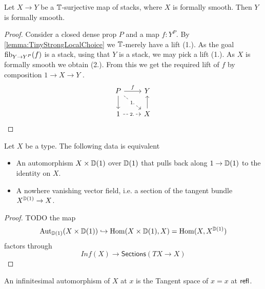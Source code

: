 \begin{lemma}
	Let $X \to Y$ be a $\mathbb{T}$-surjective map of stacks, where $X$ is formally smooth. Then $Y$ is formally smooth.
\end{lemma}
\begin{proof}
	Consider a closed dense prop $P$ and a map $f : Y^P$. By \ref{lemma:TinyStrongLocalChoice} we $\mathbb{T}$-merely have a lift (1.). As the goal $\operatorname{fib}_{Y \to Y^P}(f)$ is a stack, using that $Y$ is a stack, we may pick a lift (1.). As $X$ is formally smooth we obtain (2.). From this we get the required lift of $f$ by composition $1 \to X \to Y$ .
	\[\begin{tikzcd}
		P & Y \\
		1 & X
		\arrow["f",from=1-1, to=1-2]
		\arrow[from=1-1, to=2-1]
		\arrow["{1.}"{description}, dashed, from=1-1, to=2-2]
		\arrow["{2.}"{description}, dashed, from=2-1, to=2-2]
		\arrow[from=2-2, to=1-2]
	\end{tikzcd}\]
\end{proof}
\begin{lemma}[TODO]
	Let $X$ be a type. The following data is equivalent
	\begin{itemize}
		\item An automorphism $X \times \mathbb{D}(1)$ over $\mathbb{D}(1)$ that pulls back along $1 \to \mathbb{D}(1)$ to the identity on $X$.
		\item A nowhere vanishing vector field, i.e. a section of the tangent bundle $X^{\mathbb{D}(1)} \to X$.
	\end{itemize}
\end{lemma}
\begin{proof}
	TODO
	the map
	\[
	\operatorname{Aut}_{\mathbb{D}(1)}(X \times \mathbb{D}(1)) \hookrightarrow \operatorname{Hom}(X \times \mathbb{D}(1) , X) = \operatorname{Hom}(X , X^{\mathbb{D}(1)})
	\]
	factors through 
	\[
	Inf(X) \to \mathsf{Sections} (T X \to X)
	\]
\end{proof}

\begin{definition}
	An infinitesimal automorphism of $X$ at $x$ is the Tangent space of $x = x$ at $\mathsf{refl}$.
\end{definition}